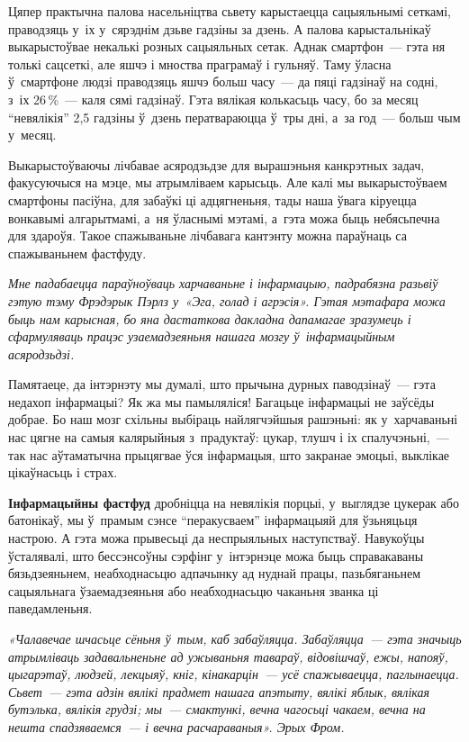 Цяпер практычна палова насельніцтва сьвету карыстаецца сацыяльнымі сеткамі, праводзяць у~іх у~сярэднім дзьве гадзіны за дзень. А палова карыстальнікаў выкарыстоўвае некалькі розных сацыяльных сетак. Аднак смартфон~--- гэта ня толькі сацсеткі, але яшчэ і мноства праграмаў і гульняў. Таму ўласна ў~смартфоне людзі праводзяць яшчэ больш часу~--- да пяці гадзінаў на содні, з~іх 26\,\%~--- каля сямі гадзінаў. Гэта вялікая колькасьць часу, бо за месяц ``невялікія'' 2,5 гадзіны ў~дзень ператвараюцца ў~тры дні, а~за год~--- больш чым у~месяц.

Выкарыстоўваючы лічбавае асяродзьдзе для вырашэньня канкрэтных задач, факусуючыся на мэце, мы атрымліваем карысьць. Але калі мы выкарыстоўваем смартфоны пасіўна, для забаўкі ці адцягненьня, тады наша ўвага кіруецца вонкавымі алгарытмамі, а~ня ўласнымі мэтамі, а~гэта можа быць небясьпечна для здароўя. Такое спажываньне лічбавага кантэнту можна параўнаць са спажываньнем фастфуду.

\emph{Мне падабаецца параўноўваць харчаваньне і інфармацыю, падрабязна разьвіў гэтую тэму Фрэдэрык Пэрлз у~«Эга, голад і агрэсія». Гэтая мэтафара можа быць нам карысная, бо яна дастаткова дакладна дапамагае зразумець і сфармуляваць працэс узаемадзеяньня нашага мозгу ў~інфармацыйным асяродзьдзі.} 

Памятаеце, да інтэрнэту мы думалі, што прычына дурных паводзінаў~--- гэта недахоп інфармацыі? Як жа мы памыляліся! Багацьце інфармацыі не заўсёды добрае. Бо наш мозг схільны выбіраць найлягчэйшыя рашэньні: як у~харчаваньні нас цягне на самыя калярыйныя з~прадуктаў: цукар, тлушч і іх спалучэньні,~--- так нас аўтаматычна прыцягвае ўся інфармацыя, што закранае эмоцыі, выклікае цікаўнасьць і страх.

\textbf{Інфармацыйны фастфуд} дробніцца на невялікія порцыі, у~выглядзе цукерак або батонікаў, мы ў~прамым сэнсе ``перакусваем'' інфармацыяй для ўзьняцьця настрою. А гэта можа прывесьці да неспрыяльных наступстваў. Навукоўцы ўсталявалі, што бессэнсоўны сэрфінг у~інтэрнэце можа быць справакаваны бязьдзеяньнем, неабходнасьцю адпачынку ад нуднай працы, пазьбяганьнем сацыяльнага ўзаемадзеяньня або неабходнасьцю чаканьня званка ці паведамленьня.

\emph{«Чалавечае шчасьце сёньня ў~тым, каб забаўляцца. Забаўляцца~--- гэта значыць атрымліваць задавальненьне ад ужываньня тавараў, відовішчаў, ежы, напояў, цыгарэтаў, людзей, лекцыяў, кніг, кінакарцін~--- усё спажываецца, паглынаецца. Сьвет~--- гэта адзін вялікі прадмет нашага апэтыту, вялікі яблык, вялікая бутэлька, вялікія грудзі; мы~--- смактункі, вечна чагосьці чакаем, вечна на нешта спадзяваемся~--- і вечна расчараваныя». Эрых Фром.} 

